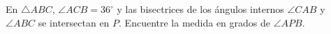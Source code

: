 En $\triangle ABC$, $\angle ACB = 36^\circ$ y las bisectrices de los ángulos internos $\angle CAB$ y $\angle ABC$ se intersectan en $P$. Encuentre la medida en grados de $\angle APB$.